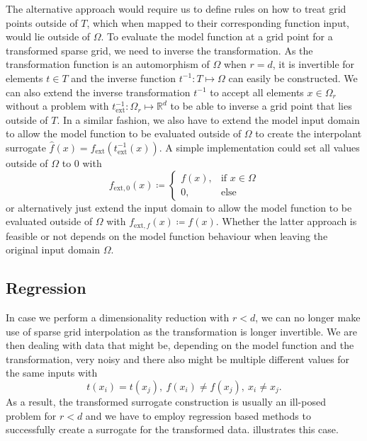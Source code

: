 \documentclass[
  a4paper,  %
  twoside,  %
  bibliography=totoc,
  headsepline,
  cleardoublepage=empty,
  parskip=half,
  draft=false
]{scrbook}
\begin{document}
The alternative approach would require us to define rules on how to treat grid points outside of $T$, which when mapped to their corresponding function input, would lie outside of $\Omega$.
To evaluate the model function at a grid point for a transformed sparse grid, we need to inverse the transformation.
As the transformation function is an automorphism of $\Omega$ when $r=d$, it is invertible for elements $t \in T$ and the inverse function $t^{-1} \colon T \mapsto \Omega$ can easily be constructed.
We can also extend the inverse transformation $t^{-1}$ to accept all elements $x \in \Omega_r$ without a problem with $t^{-1}_{\text{ext}} \colon \Omega_r \mapsto \mathds{R}^d$ to be able to inverse a grid point that lies outside of $T$.
In a similar fashion, we also have to extend the model input domain to allow the model function to be evaluated outside of $\Omega$ to create the interpolant surrogate $\hat{f}(x)=f_\text{ext}(t^{-1}_{\text{ext}}(x))$.
A simple implementation could set all values outside of $\Omega$ to 0 with
\begin{equation}
f_{\text{ext}, 0}(x) \coloneqq \begin{cases}
f(x), &\text{if $x \in \Omega$}\\
0, &\text{else}
\end{cases}
\end{equation}
or alternatively just extend the input domain to allow the model function to be evaluated outside of $\Omega$ with $f_{\text{ext}, f}(x) \coloneqq f(x)$.
Whether the latter approach is feasible or not depends on the model function behaviour when leaving the original input domain $\Omega$.

\subsection{Regression}
In case we perform a dimensionality reduction with $r < d$, we can no longer make use of sparse grid interpolation as the transformation is longer invertible.
We are then dealing with data that might be, depending on the model function and the transformation, very noisy and there also might be multiple different values for the same inputs with
\begin{equation}
t(x_i)=t(x_j), ~ f(x_i) \neq f(x_j), ~ x_i \neq x_j.
\end{equation}
As a result, the transformed surrogate construction is usually an ill-posed problem for $r < d$ and we have to employ regression based methods to successfully create a surrogate for the transformed data.
 illustrates this case.
\end{document}
